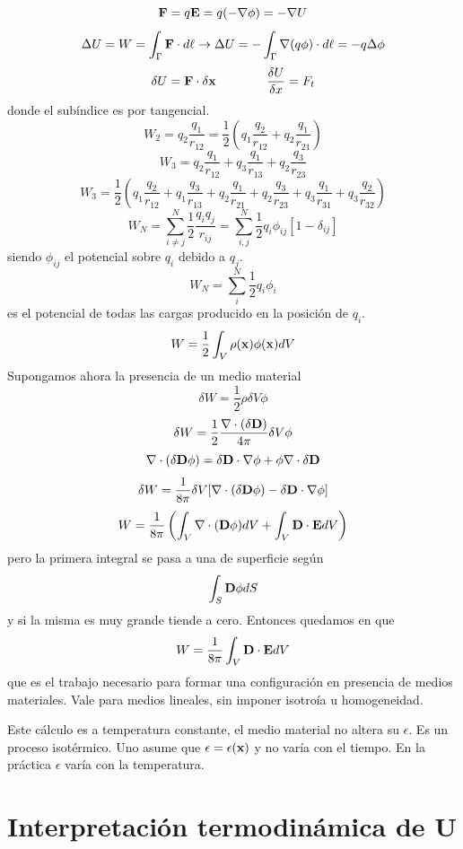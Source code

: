 \documentclass[10pt,oneside]{CBFT_book}
\begin{document}
\[
	\vb{F} = q \vb{E} = q (-\Nabla\phi) = - \Nabla U
\]
\[
	\Delta U = W = \int_\Gamma \vb{F}\cdot d\vb{\ell} \rightarrow \Delta U = 
	- \int_\Gamma \Nabla (q\phi) \cdot d\vb{\ell} = -q \Delta \phi
\]
\[
	\delta U = \vb{F}\cdot\delta\vb{x} \qquad\qquad  \frac{\delta U}{\delta x} = F_t
\]
donde el subíndice es por tangencial.
\[
	W_2 = q_2 \frac{q_1}{r_{12}} = \frac{1}{2}\left( q_1 \frac{q_2}{r_{12}} + 
		q_2 \frac{q_1}{r_{21}} \right)
\]
\[
	W_3 = q_2 \frac{q_1}{r_{12}} + q_3 \frac{q_1}{r_{13}} + q_2 \frac{q_3}{r_{23}}
\]
\[
	W_3 = \frac{1}{2}\left( q_1 \frac{q_2}{r_{12}} + q_1 \frac{q_3}{r_{13}} + q_2 \frac{q_1}{r_{21}}
		+ q_2 \frac{q_3}{r_{23}} + q_3 \frac{q_1}{r_{31}} + q_3 \frac{q_2}{r_{32}} \right)
\]
\[
	W_N = \sum_{i\neq j}^N \frac{1}{2}\frac{q_i q_j}{r_{ij}} =
	\sum_{i,j}^N \frac{1}{2} q_i \phi_{ij}[ 1 - \delta_{ij}]
\]
siendo $\phi_{ij}$ el potencial sobre $q_i$ debido a $q_j$.
\[
	W_N = \sum_i^N \frac{1}{2} q_i \phi_i 
\]
es el potencial de todas las cargas producido en la posición de $q_i$.
\[
	W = \frac{1}{2} \int_V \rho(\vb{x}) \phi(\vb{x}) dV
\]
Supongamos ahora la presencia de un medio material 
\[
	\delta W = \frac{1}{2} \rho \delta V \phi
\]
\[
	\delta W = \frac{1}{2}\frac{\Nabla\cdot(\delta\vb{D})}{4\pi} \delta V \phi 
\]
\[
	\Nabla\cdot(\delta\vb{D}\phi) = \delta\vb{D} \cdot \Nabla\phi  + \phi \Nabla\cdot\delta\vb{D}
\]
\[
	\delta W = \frac{1}{8\pi} \delta V [\Nabla\cdot(\delta\vb{D}\phi) - \delta\vb{D} \cdot \Nabla\phi ]
\]
\[
	W = \frac{1}{8\pi}\left( \int_V \Nabla\cdot(\vb{D}\phi)dV + \int_V \vb{D}\cdot\vb{E} dV \right)
\]
pero la primera integral se pasa a una de superficie según
\[
	\int_S \vb{D}\phi dS
\]
y si la misma es muy grande tiende a cero. Entonces quedamos en que 
\[
	W = \frac{1}{8\pi} \int_V \vb{D}\cdot\vb{E} dV
\]
que es el trabajo necesario para formar una configuración en presencia de medios materiales. Vale
para medios lineales, sin imponer isotroía u homogeneidad.

Este cálculo es a temperatura constante, el medio material no altera su $\epsilon$.
Es un proceso isotérmico. Uno asume que $\epsilon=\epsilon(\vb{x})$ y no varía con el tiempo.
En la práctica $\epsilon$ varía con la temperatura.

\section{Interpretación termodinámica de U}
\end{document}
